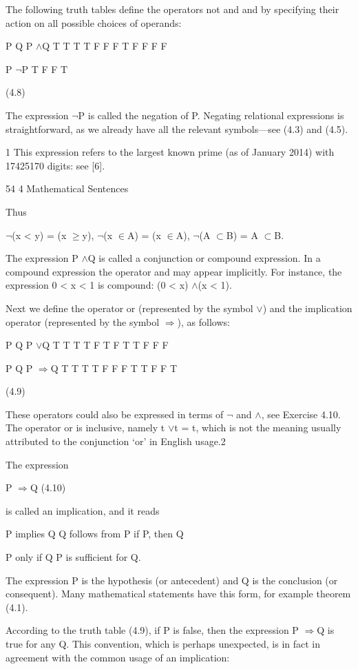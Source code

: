 \documentclass[11pt]{article}
\theoremstyle{plain}
\theoremstyle{definition}
\begin{document}
The following truth tables define the operators not and and by specifying their action on all possible choices of operands:

P Q P $\land$Q T T T T F F F T F F F F

P $\neg$P T F F T

(4.8)

The expression $\neg$P is called the negation of P. Negating relational expressions is straightforward, as we already have all the relevant symbols---see (4.3) and (4.5).

1 This expression refers to the largest known prime (as of January 2014) with 17425170 digits: see [6].

54 4 Mathematical Sentences

Thus

$\neg$(x < y) = (x $\geq$y), $\neg$(x $\in$A) = (x $\in$A), $\neg$(A $\subset$B) = A $\subset$B.

The expression P $\land$Q is called a conjunction or compound expression. In a compound expression the operator and may appear implicitly. For instance, the expression 0 < x < 1 is compound: (0 < x) $\land$(x < 1).

Next we define the operator or (represented by the symbol $\lor$) and the implication operator (represented by the symbol $\Rightarrow$), as follows:

P Q P $\lor$Q T T T T F T F T T F F F

P Q P $\Rightarrow$Q T T T T F F F T T F F T

(4.9)

These operators could also be expressed in terms of $\neg$ and $\land$, see Exercise 4.10. The operator or is inclusive, namely t $\lor$t = t, which is not the meaning usually attributed to the conjunction `or' in English usage.2

The expression

P $\Rightarrow$Q (4.10)

is called an implication, and it reads

P implies Q Q follows from P if P, then Q

P only if Q P is sufficient for Q.

The expression P is the hypothesis (or antecedent) and Q is the conclusion (or consequent). Many mathematical statements have this form, for example theorem (4.1).

According to the truth table (4.9), if P is false, then the expression P $\Rightarrow$Q is true for any Q. This convention, which is perhaps unexpected, is in fact in agreement with the common usage of an implication:
\end{document}
